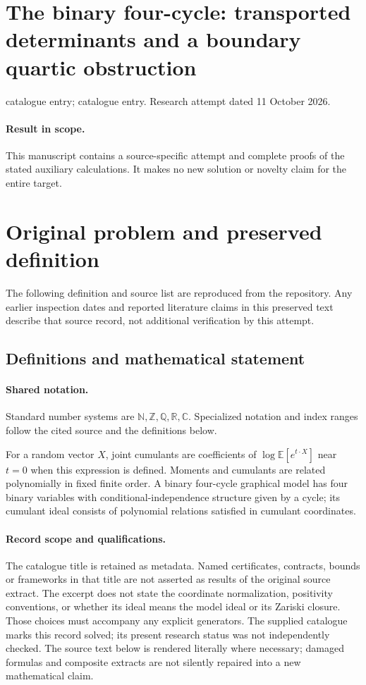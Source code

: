 \documentclass[11pt]{article}
\begin{document}
\section*{The binary four-cycle: transported determinants and a boundary quartic obstruction}
\noindent catalogue entry; catalogue entry. Research attempt dated 11 October 2026.
\paragraph{Result in scope.}This manuscript contains a source-specific attempt and complete proofs of the stated auxiliary calculations. It makes no new solution or novelty claim for the entire target.
\section{Original problem and preserved definition}
The following definition and source list are reproduced from the repository. Any earlier inspection dates and reported literature claims in this preserved text describe that source record, not additional verification by this attempt.
\subsection{Definitions and mathematical statement}

\paragraph{Shared notation.}Standard number systems are $\mathbb N,\mathbb Z,\mathbb Q,\mathbb R,\mathbb C$. Specialized notation and index ranges follow the cited source and the definitions below.


For a random vector $X$, joint cumulants are coefficients of $\log\mathbb E[e^{t\cdot X}]$ near $t=0$ when this expression is defined. Moments and cumulants are related polynomially in fixed finite order. A binary four-cycle graphical model has four binary variables with conditional-independence structure given by a cycle; its cumulant ideal consists of polynomial relations satisfied in cumulant coordinates.
\paragraph{Record scope and qualifications.}
The catalogue title is retained as metadata. Named certificates, contracts, bounds or frameworks in that title are not asserted as results of the original source extract.
The excerpt does not state the coordinate normalization, positivity conventions, or whether its ideal means the model ideal or its Zariski closure. Those choices must accompany any explicit generators. The supplied catalogue marks this record solved; its present research status was not independently checked.
The source text below is rendered literally where necessary; damaged formulas and composite extracts are not silently repaired into a new mathematical claim.
\end{document}
